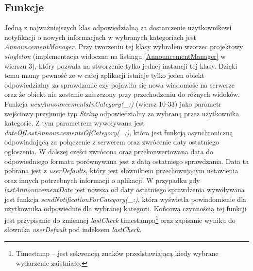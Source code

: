 \documentclass{iiuwb}
\begin{document}
\subsection{Funkcje}
Jedną z najważniejszych klas odpowiedzialną za dostarczenie użytkownikowi notyfikacji o nowych informacjach w wybranych kategoriach jest \textit{AnnouncementManager}. Przy tworzeniu tej klasy wybrałem wzorzec projektowy \textit{singleton} \cite{Gamma:2010:Wzorce} (implementacja widoczna na listingu \ref{AnnouncementManager} w wierszu 3), który pozwala na stworzenie tylko jednej instancji tej klasy. Dzięki temu mamy pewność ze w całej aplikacji istnieje tylko jeden obiekt odpowiedzialny za sprawdzanie czy pojawiła się nowa wiadomość na serwerze oraz że obiekt nie zostanie zniszczony przy przechodzeniu do różnych widoków. Funkcja \textit{newAnnouncementsInCategory(\_:)} (wiersz 10-33) jako parametr wejściowy przyjmuje typ \textit{String} odpowiedzialny za wybraną przez użytkownika kategorie. Z tym parametrem wywoływana jest \textit{dateOfLastAnnouncementsOfCategory(\_:)}, która jest funkcją asynchroniczną odpowiadającą za połączenie z serwerem oraz zwrócenie daty ostatniego ogłoszenia. W dalszej części zwrócona oraz przekonwertowana data do odpowiedniego formatu porównywana jest z datą ostatniego sprawdzania. Data ta pobrana jest z \textit{userDefaults}, który jest słownikiem  przechowującym ustawienia oraz innych potrzebnych informacji o aplikacji. W przypadku gdy \textit{lastAnnouncementDate} jest nowsza od daty ostatniego sprawdzenia wywoływana jest funkcja \textit{sendNotificationForCategory(\_:)}, która wyświetla powiadomienie dla użytkownika odpowiednie dla wybranej kategorii. Końcową czynnością tej funkcji jest przypisanie do zmiennej \textit{lastCheck} timestampa\footnote{Timestamp -- jest sekwencją znaków przedstawiającą kiedy wybrane wydarzenie zaistniało.} oraz zapisanie wyniku do słownika \textit{userDefault} pod indeksem \textit{lastCheck}.
\newpage
\end{document}
